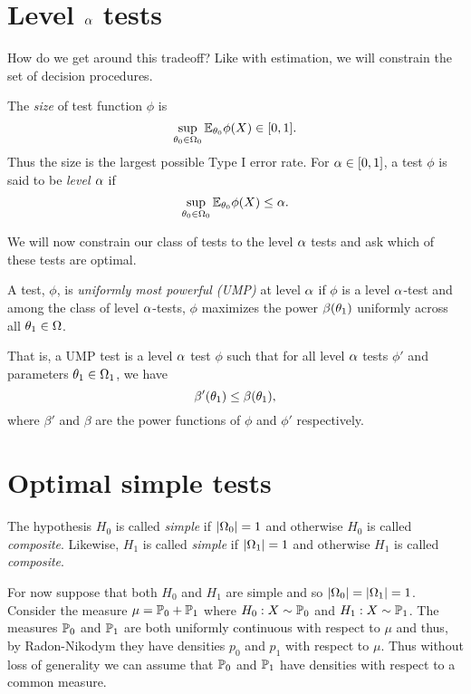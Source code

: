 \section{Level ${\alpha}$ tests}
How do we get around this tradeoff? Like with estimation, we will constrain the set of decision procedures. 
\begin{defn}
    The \emph{size} of test function $\phi$ is 
    \[\sup_{{\theta}_0 \in {{\Omega}}_0} {\mathbb{E}}_{{\theta}_0}\phi(X) \in [0,1]. \]
    Thus the size is the largest possible Type I error rate. For ${\alpha} \in [0,1]$, a test $\phi$ is said to be \emph{level ${\alpha}$} if 
    \[\sup_{{\theta}_0 \in {{\Omega}}_0}{\mathbb{E}}_{{\theta}_0}\phi(X) \le {\alpha}. \]
\end{defn}
We will now constrain our class of tests to the level ${\alpha}$ tests and ask which of these tests are optimal.
\begin{defn}
    A test, $\phi$, is \emph{uniformly most powerful (UMP)} at level ${\alpha}$ if $\phi$ is a level ${\alpha}$-test and among the class of level ${\alpha}$-tests, $\phi$ maximizes the power $\beta({\theta}_1)$ uniformly across all ${\theta}_1 \in {{\Omega}}$.
\end{defn}
That is, a UMP test is a level ${\alpha}$ test $\phi$ such that for all level ${\alpha}$ tests $\phi'$ and parameters ${\theta}_1 \in {{\Omega}}_1$, we have 
\[\beta'({\theta}_1) \le \beta({\theta}_1), \]
where $\beta'$ and $\beta$ are the power functions of $\phi$ and $\phi'$ respectively.
\section{Optimal simple tests}
\begin{defn}
    The hypothesis $H_0$ is called \emph{simple} if ${\left\lvert{{\Omega}}_0\right\rvert}=1$ and otherwise $H_0$ is called \emph{composite}. Likewise, $H_1$ is called \emph{simple} if ${\left\lvert{{\Omega}}_1\right\rvert}=1$ and otherwise $H_1$ is called \emph{composite}.
\end{defn}
For now suppose that both $H_0$ and $H_1$ are simple and so ${\left\lvert{{\Omega}}_0\right\rvert}={\left\lvert{{\Omega}}_1\right\rvert}=1$. Consider the measure $\mu = {\mathbb{P}}_0+{\mathbb{P}}_1$ where $H_0: X \sim {\mathbb{P}}_0$ and $H_1:X \sim {\mathbb{P}}_1$. The measures ${\mathbb{P}}_0$ and ${\mathbb{P}}_1$ are both uniformly continuous with respect to $\mu$ and thus, by Radon-Nikodym they have densities $p_0$ and $p_1$ with respect to $\mu$. Thus without loss of generality we can assume that ${\mathbb{P}}_0$ and ${\mathbb{P}}_1$ have densities with respect to a common measure.

